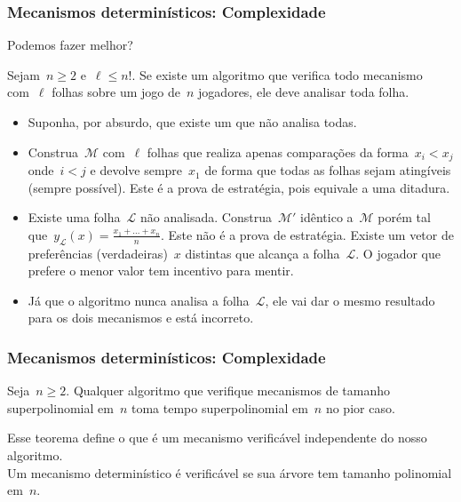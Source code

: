 \documentclass{beamer}
\begin{document}
\begin{frame}
\frametitle{Mecanismos determinísticos: Complexidade}

Podemos fazer melhor?
\begin{theorem}
Sejam~$n \geq 2$ e~$\ell \leq n!$. Se existe um algoritmo que verifica todo mecanismo com~$\ell$ folhas sobre um jogo de~$n$ jogadores, ele deve analisar toda folha.
\end{theorem}
\pause
\begin{itemize}
\item Suponha, por absurdo, que existe um que não analisa todas.
\pause
\item Construa~$\mathcal{M}$ com~$\ell$ folhas que realiza apenas comparações da forma~$x_i < x_j$ onde~$i < j$ e devolve sempre~$x_1$ de forma que todas as folhas sejam atingíveis (sempre possível). Este é a prova de estratégia, pois equivale a uma ditadura.
\pause
\item Existe uma folha~$\mathcal{L}$ não analisada. Construa~$\mathcal{M}'$ idêntico a~$\mathcal{M}$ porém tal que~$y_\mathcal{L}(x) = \frac{x_1 + \dots + x_n}{n}$. Este não é a prova de estratégia. Existe um vetor de preferências (verdadeiras)~$x$ distintas que alcança a folha~$\mathcal{L}$. O jogador que prefere o menor valor tem incentivo para mentir.
\pause
\item Já que o algoritmo nunca analisa a folha~$\mathcal{L}$, ele vai dar o mesmo resultado para os dois mecanismos e está incorreto.

\end{itemize}
\end{frame}

\begin{frame}
\frametitle{Mecanismos determinísticos: Complexidade}

\begin{theorem}
Seja~$n \geq 2$. Qualquer algoritmo que verifique mecanismos de tamanho superpolinomial em~$n$ toma tempo superpolinomial em~$n$ no pior caso.
\end{theorem}
Esse teorema define o que é um mecanismo verificável independente do nosso algoritmo. \\ 
Um mecanismo determinístico é verificável se sua árvore tem tamanho polinomial em~$n$.
\end{frame}
\end{document}
